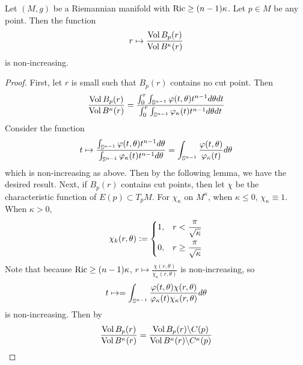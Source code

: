 \begin{enumerate}[label=\arabic{*}]
	\begin{thm}
		Let $(M,g)$ be a Riemannian manifold with $\operatorname{Ric} \geq (n-1)\kappa$. Let $p \in M$ be any point. Then the function
		\begin{equation*}
			r \mapsto \frac{\operatorname{Vol}B_p(r)}{\operatorname{Vol}B^\kappa(r)}
		\end{equation*}
		is non-increasing.
	\end{thm}
	\begin{proof}
		First, let $r$ is small such that $B_p(r)$ contains no cut point. Then
		\begin{equation*}
			\frac{\operatorname{Vol}B_p(r)}{\operatorname{Vol}B^\kappa(r)} = \frac{\int_0^{r} \int_{\mathbb{S}^{n-1}}\varphi(t,\theta) t^{n-1}d\theta dt}{\int_0^{r}\int_{\mathbb{S}^{n-1}}\varphi_\kappa(t) t^{n-1}d\theta dt}
		\end{equation*}
		Consider the function
		\begin{equation*}
			t \mapsto \frac{ \int_{\mathbb{S}^{n-1}}\varphi(t,\theta) t^{n-1}d\theta}{\int_{\mathbb{S}^{n-1}}\varphi_\kappa(t) t^{n-1}d\theta} =  \int_{\mathbb{S}^{n-1}}\frac{\varphi(t,\theta) }{\varphi_\kappa(t) }d\theta
		\end{equation*}
		which is non-increasing as above. Then by the following lemma, we have the desired result. Next, if $B_p(r)$ contains cut points, then let $\chi$ be the characteristic function of $E(p) \subset T_pM$. For $\chi_\kappa$ on $M^\kappa$, when $\kappa \leq 0$, $\chi_\kappa \equiv 1$. When $\kappa > 0$,
		\begin{equation*}
			\chi_k(r,\theta) \vcentcolon= \left\{
				\begin{aligned}
					1,&\quad r < \frac{\pi}{\sqrt{\kappa}} \\
					0,&\quad r \geq \frac{\pi}{\sqrt{\kappa}}
				\end{aligned}
			\right.
		\end{equation*}
		Note that because $\operatorname{Ric} \geq (n-1)\kappa$, $r \mapsto \frac{\chi(r,\theta)}{\chi_\kappa(r,\theta)}$ is non-increasing, so
		\begin{equation*}
			t \mapsto  =  \int_{\mathbb{S}^{n-1}}\frac{\varphi(t,\theta) \chi(r,\theta)}{\varphi_\kappa(t) \chi_\kappa(r,\theta)}d\theta
		\end{equation*}
		is non-increasing. Then by
		\begin{equation*}
			\begin{aligned}
				\frac{\op{Vol}B_p(r)}{\op{Vol}B^\kappa(r)} &= \frac{\op{Vol}B_p(r) \backslash C(p)}{\op{Vol}B^\kappa(r)\backslash C^\kappa(p)} \\

\end{aligned}
\end{equation*}
\end{proof}
\end{enumerate}
